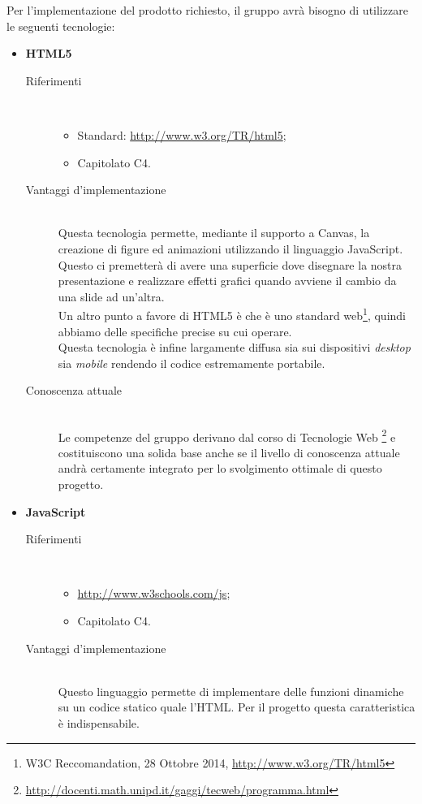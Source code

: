 Per l'implementazione del prodotto richiesto, il gruppo avrà bisogno di utilizzare le seguenti tecnologie:
\begin{itemize}
	\item \textbf{HTML5}
	\begin{description}
		\item[Riferimenti]\ 
		\noindent\begin{itemize}
			\item Standard: \url{http://www.w3.org/TR/html5};
			\item Capitolato C4.
		\end{itemize}
		
		\item[Vantaggi d'implementazione]\ \\
		\noindent Questa tecnologia permette, mediante il supporto a Canvas, la creazione di figure ed animazioni  utilizzando il linguaggio JavaScript. Questo ci premetterà di avere una superficie dove disegnare la nostra presentazione e realizzare effetti grafici quando avviene il cambio da una slide ad un'altra. \\ Un altro punto a favore di HTML5 è che è uno standard web\footnote{W3C Reccomandation, 28 Ottobre 2014, \url{http://www.w3.org/TR/html5}}, quindi abbiamo delle specifiche precise su cui operare. \\ Questa tecnologia è infine largamente diffusa sia sui dispositivi \textit{desktop} sia \textit{mobile} rendendo il codice estremamente portabile.

		\item[Conoscenza attuale]\ \\
		\noindent Le competenze del gruppo \GRUPPO{}  derivano dal corso di Tecnologie Web \footnote{\url{http://docenti.math.unipd.it/gaggi/tecweb/programma.html}} e costituiscono una solida base anche se il livello di conoscenza attuale andrà certamente integrato per lo svolgimento ottimale di questo progetto.
	\end{description}

	\item \textbf{JavaScript}
	\begin{description}
		\item[Riferimenti]\ 
		\noindent\begin{itemize}
			\item \url{http://www.w3schools.com/js};
			\item Capitolato C4.
		\end{itemize}
		
		\item[Vantaggi d'implementazione]\ \\ 
		\noindent Questo linguaggio permette di implementare delle funzioni dinamiche su un codice statico quale l'HTML. Per il progetto \PROGETTO{} questa caratteristica è indispensabile.
		

\end{description}
\end{itemize}
